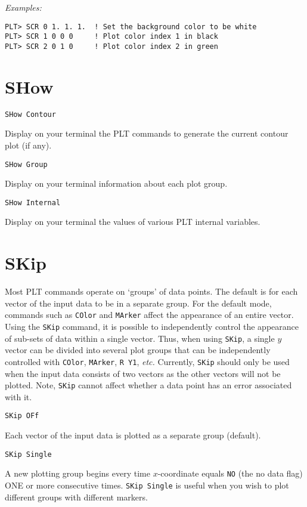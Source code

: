 \medskip\noindent
{\em Examples:}
\begin{verbatim}
PLT> SCR 0 1. 1. 1.  ! Set the background color to be white
PLT> SCR 1 0 0 0     ! Plot color index 1 in black
PLT> SCR 2 0 1 0     ! Plot color index 2 in green
\end{verbatim}

\section*{SHow}
\begin{verbatim}
SHow Contour
\end{verbatim}
   Display on your terminal the PLT commands to generate the current
contour plot (if any).

\begin{verbatim}
SHow Group
\end{verbatim}
   Display on your terminal information about each plot group.

\medskip
\begin{verbatim}
SHow Internal
\end{verbatim}
   Display on your terminal the values of various PLT internal variables.

\section*{SKip}
Most PLT commands operate on `groups' of data points.  The default
is for each vector of the input data to be in a separate group.  For
the default mode, commands such as {\tt COlor} and {\tt MArker} affect the
appearance of an entire vector.  Using the {\tt SKip} command, it is
possible to independently control the appearance of sub-sets of data
within a single vector.  Thus, when using {\tt SKip}, a single $y$ vector
can be divided into several plot groups that can be independently
controlled with {\tt COlor}, {\tt MArker}, {\tt R~Y1}, {\it etc.}  Currently, {\tt SKip}
should only be used when the input data consists of two vectors as
the other vectors will not be plotted.  Note, {\tt SKip} cannot affect
whether a data point has an error associated with it.

\begin{verbatim}
SKip OFf
\end{verbatim}
   Each vector of the input data is plotted as a separate group
(default).

\medskip
\begin{verbatim}
SKip Single
\end{verbatim}
   A new plotting group begins every time $x$-coordinate equals {\tt NO} (the
no data flag) ONE or more consecutive times.  {\tt SKip~Single} is useful
when you wish to plot different groups with different markers.

